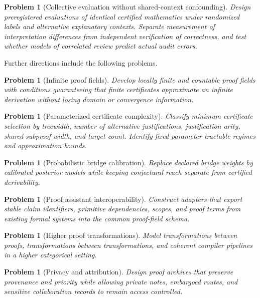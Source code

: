 \documentclass[11pt,oneside]{article}
\theoremstyle{komorebiplain}
\theoremstyle{komorebidefinition}
\newtheorem{problem}[theorem]{Problem}
\theoremstyle{komorebiremark}
\begin{document}
\begin{problem}[Collective evaluation without shared-context confounding]
\label{res:28:3}
Design preregistered evaluations of identical certified mathematics under randomized labels and alternative explanatory contexts. Separate measurement of interpretation differences from independent verification of correctness, and test whether models of correlated review predict actual audit errors.
\end{problem}



Further directions include the following problems.

\begin{problem}[Infinite proof fields]
\label{res:28:4}
Develop locally finite and countable proof fields with conditions guaranteeing that finite certificates approximate an infinite derivation without losing domain or convergence information.
\end{problem}

\begin{problem}[Parameterized certificate complexity]
\label{res:28:5}
Classify minimum certificate selection by treewidth, number of alternative justifications, justification arity, shared-subproof width, and target count. Identify fixed-parameter tractable regimes and approximation bounds.
\end{problem}

\begin{problem}[Probabilistic bridge calibration]
\label{res:28:6}
Replace declared bridge weights by calibrated posterior models while keeping conjectural reach separate from certified derivability.
\end{problem}

\begin{problem}[Proof assistant interoperability]
\label{res:28:7}
Construct adapters that export stable claim identifiers, primitive dependencies, scopes, and proof terms from existing formal systems into the common proof-field schema.
\end{problem}

\begin{problem}[Higher proof transformations]
\label{res:28:8}
Model transformations between proofs, transformations between transformations, and coherent compiler pipelines in a higher categorical setting.
\end{problem}

\begin{problem}[Privacy and attribution]
\label{res:28:9}
Design proof archives that preserve provenance and priority while allowing private notes, embargoed routes, and sensitive collaboration records to remain access controlled.
\end{problem}
\end{document}
